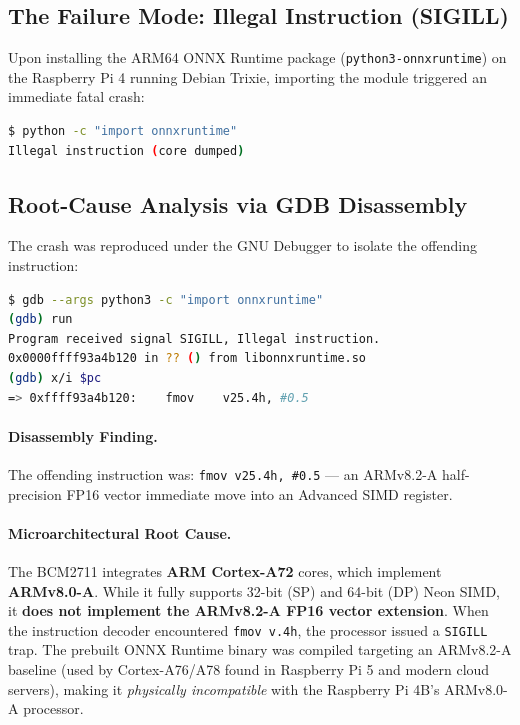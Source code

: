 \documentclass[12pt,a4paper]{article}
\begin{document}
\subsection{The Failure Mode: Illegal Instruction (SIGILL)}

Upon installing the ARM64 ONNX Runtime package (\texttt{python3-onnxruntime}) on the
Raspberry Pi 4 running Debian Trixie, importing the module triggered an immediate fatal crash:

\begin{lstlisting}[language=bash, caption={ONNX Runtime fatal crash on Cortex-A72 (Raspberry Pi 4B)}]
$ python -c "import onnxruntime"
Illegal instruction (core dumped)
\end{lstlisting}

\subsection{Root-Cause Analysis via GDB Disassembly}

The crash was reproduced under the GNU Debugger to isolate the offending instruction:
\begin{lstlisting}[language=bash, caption={GDB session identifying the illegal FP16 instruction}]
$ gdb --args python3 -c "import onnxruntime"
(gdb) run
Program received signal SIGILL, Illegal instruction.
0x0000ffff93a4b120 in ?? () from libonnxruntime.so
(gdb) x/i $pc
=> 0xffff93a4b120:    fmov    v25.4h, #0.5
\end{lstlisting}

\paragraph{Disassembly Finding.}
The offending instruction was: \texttt{fmov v25.4h, \#0.5} --- an ARMv8.2-A
half-precision FP16 vector immediate move into an Advanced SIMD register.

\paragraph{Microarchitectural Root Cause.}
The BCM2711 integrates \textbf{ARM Cortex-A72} cores, which implement \textbf{ARMv8.0-A}.
While it fully supports 32-bit (SP) and 64-bit (DP) Neon SIMD, it
\textbf{does not implement the ARMv8.2-A FP16 vector extension}. When the instruction
decoder encountered \texttt{fmov v.4h}, the processor issued a \texttt{SIGILL} trap.
The prebuilt ONNX Runtime binary was compiled targeting an ARMv8.2-A baseline (used by
Cortex-A76/A78 found in Raspberry Pi 5 and modern cloud servers), making it
\textit{physically incompatible} with the Raspberry Pi 4B's ARMv8.0-A processor.
\end{document}
